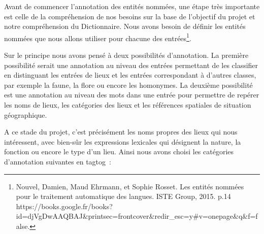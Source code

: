 \documentclass[a4paper,12pt,twoside]{book}
\begin{document}
Avant de commencer l’annotation des entités nommées, une étape très importante est celle de la compréhension de nos besoins sur la base de l’objectif du projet et notre compréhension du Dictionnaire. Nous avons besoin de définir les entités nommées que nous allons utiliser pour chacune des entrées\footnote{Nouvel, Damien, Maud Ehrmann, et Sophie Rosset. Les entités nommées pour le traitement automatique des langues. ISTE Group, 2015. p.14  https://books.google.fr/books?id=djVgDwAAQBAJ\&printsec=frontcover\&redir\_esc=y\#v=onepage\&q\&f=false.}.

Sur le principe nous avons pensé à deux possibilités d’annotation. La première possibilité serait une annotation au niveau des entrées permettant de les classifier en distinguant les entrées de lieux et les entrées correspondant à d’autres classes, par exemple la faune, la flore ou encore les homonymes. La deuxième possibilité est une annotation au niveau des mots dans une entrée pour permettre de repérer les noms de lieux, les catégories des lieux et les références spatiales de situation géographique.

A ce stade du projet, c’est précisément les noms propres des lieux qui nous intéressent, avec bien-sûr les expressions lexicales qui désignent la nature, la fonction ou encore le type d’un lieu. Ainsi nous avons choisi les catégories d’annotation suivantes en tagtog :\\
\end{document}
